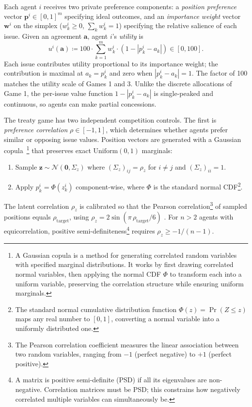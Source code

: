 Each agent $i$ receives two private preference components: a \emph{position preference} vector $\bm{p}^{i} \in [0,1]^{m}$ specifying ideal outcomes, and an \emph{importance weight} vector $\bm{w}^{i}$ on the simplex ($w^{i}_{k} \geq 0$, $\sum_{k} w^{i}_{k} = 1$) specifying the relative salience of each issue.
Given an agreement $\bm{a}$, agent $i$'s \emph{utility} is
\begin{equation}
    u^i(\bm{a}) \coloneqq 100 \cdot \sum_{k=1}^{m} w^{i}_{k} \cdot (1 - |p^{i}_{k} - a_k|) \in [0,100].
\end{equation}
Each issue contributes utility proportional to its importance weight; the contribution is maximal at $a_k = p^{i}_{k}$ and zero when $|p^{i}_{k} - a_k| = 1$.
The factor of 100 matches the utility scale of Games 1 and 3.
Unlike the discrete allocations of Game 1, the per-issue value function $1 - |p^i_k - a_k|$ is single-peaked and continuous, so agents can make partial concessions.

The treaty game has two independent competition controls.
The first is \emph{preference correlation} $\rho \in [-1,1]$, which determines whether agents prefer similar or opposing issue values.
Position vectors are generated with a Gaussian copula~\citep{nelsen2006copulas}\footnote{A Gaussian copula is a method for generating correlated random variables with specified marginal distributions. It works by first drawing correlated normal variables, then applying the normal CDF $\Phi$ to transform each into a uniform variable, preserving the correlation structure while ensuring uniform marginals.} that preserves exact $\text{Uniform}(0,1)$ marginals:
\begin{enumerate}
    \item Sample $\bm{z} \sim \mathcal{N}(\bm{0}, \Sigma_z)$ where $(\Sigma_z)_{ij} = \rho_z$ for $i \neq j$ and $(\Sigma_z)_{ii} = 1$.
    \item Apply $p^i_k = \Phi(z^i_k)$ component-wise, where $\Phi$ is the standard normal CDF\footnote{The standard normal cumulative distribution function $\Phi(z) = \Pr(Z \leq z)$ maps any real number to $[0,1]$, converting a normal variable into a uniformly distributed one.}.
\end{enumerate}
The latent correlation $\rho_z$ is calibrated so that the Pearson correlation\footnote{The Pearson correlation coefficient measures the linear association between two random variables, ranging from $-1$ (perfect negative) to $+1$ (perfect positive).} of sampled positions equals $\rho_{\text{target}}$, using $\rho_z = 2\sin(\pi\,\rho_{\text{target}} / 6)$ \citep{kruskal1958,Embrechts_McNeil_Straumann_2002}.
For $n > 2$ agents with equicorrelation, positive semi-definiteness\footnote{A matrix is positive semi-definite (PSD) if all its eigenvalues are non-negative. Correlation matrices must be PSD; this constrains how negatively correlated multiple variables can simultaneously be.} requires $\rho_z \geq -1/(n-1)$.

